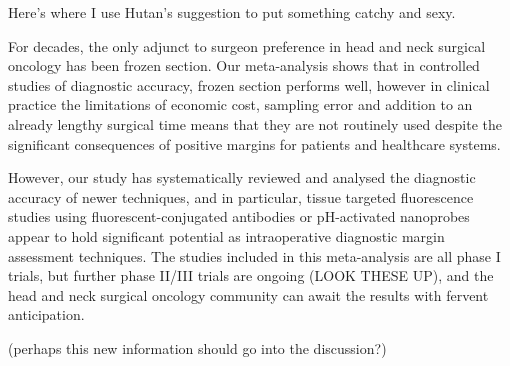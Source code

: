 Here's where I use Hutan's suggestion to put something catchy and sexy.

For decades, the only adjunct to surgeon preference in head and neck surgical oncology has been frozen section.
Our meta-analysis shows that in controlled studies of diagnostic accuracy, frozen section performs well, however in clinical practice the limitations of economic cost, sampling error and addition to an already lengthy surgical time means that they are not routinely used despite the significant consequences of positive margins for patients and healthcare systems.

However, our study has systematically reviewed and analysed the diagnostic accuracy of newer techniques, and in particular, tissue targeted fluorescence studies using fluorescent-conjugated antibodies or pH-activated nanoprobes appear to hold significant potential as intraoperative diagnostic margin assessment techniques.
The studies included in this meta-analysis are all phase I trials, but further phase II/III trials are ongoing (LOOK THESE UP), and the head and neck surgical oncology community can await the results with fervent anticipation.

(perhaps this new information should go into the discussion?)
